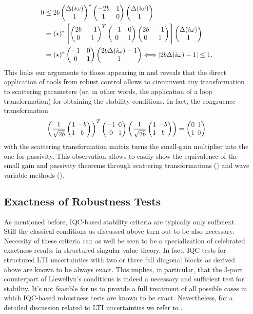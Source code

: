 \begin{align*}
0&\leq  2b\pmatr{\Delta(\iw)\\ 1 }^*\pmatr{-2b &1\\1 &0}\pmatr{\Delta(\iw)\\1} \\\nonumber  %
&=(\star)^*\left[\pmatr{2b&-1\\0&1}^T\pmatr{-1 &0\\0 &1}\pmatr{2b&-1\\0&1}\right]\pmatr{\Delta(\iw)\\1}\\\nonumber
&=(\star)^*\pmatr{-1 &0\\0 &1}\pmatr{2b\Delta(\iw) - 1\\ 1 } \Longleftrightarrow |2b\Delta(\iw)-1| \leq 1.
\end{align*}
This links our arguments to those appearing in \cite{colgate2,colgate3} and reveals that the direct application of 
tools from robust control allows to circumvent any transformation to scattering parameters (or, in other words, 
the application of a loop transformation) for obtaining the stability conditions. In fact, the congruence transformation
\begin{equation*}\arraycolsep0.5ex
\left(\frac{1}{\sqrt{2b}}\pmatr{1 &-b\\1&b}\right)^T\pmatr{-1 &0\\0
&1}
\left(\frac{1}{\sqrt{2b}}\pmatr{1 &-b\\1 &b}\right) = \pmatr{0&1 \\
1 &0}
\end{equation*}
with the scattering transformation matrix turns the small-gain multiplier into the one for passivity. This observation 
allows to easily show the equivalence of the small gain and passivity theorems through scattering transformations 
(\cite{andersonspong}) and wave variable methods (\cite{nieslotine,nieslotine2}).


\subsection{Exactness of Robustness Tests}\label{sec:exact}
As mentioned before, IQC-based stability criteria are typically only sufficient.
Still the classical conditions as discussed above %
turn out to be also necessary. Necessity of these criteria can as well be seen to be a specialization of
celebrated exactness results in structured singular-value theory. In fact, IQC tests
for structured LTI uncertainties with two or three full diagonal blocks as derived above are known to be always exact.
This implies, in particular, that the 3-port counterpart of Llewellyn's conditions is indeed
a necessary and sufficient test for stability. It's not feasible for us to provide a full treatment of all possible 
cases in which IQC-based robustness tests are known to be exact. Nevertheless, for a detailed discussion related to LTI 
uncertainties we refer to \cite{packdoyle,fantits,cwssimax}.

